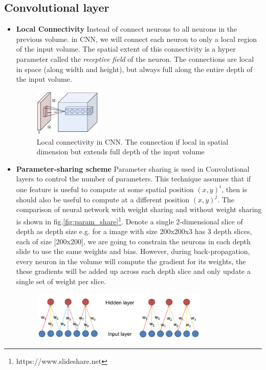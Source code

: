 \subsection{Convolutional layer}
\begin{itemize}
    \item \textbf{Local Connectivity} Instead of connect neurons to all neurons in the previous volume. in \acrshort{CNN}, we will connect each neuron to only a local region of the input volume. The spatial extent of this connectivity is a hyper parameter called the \textit{receptive field} of the neuron. The connections are local in space (along width and height), but always full along the entire depth of the input volume.
    \begin{figure}[h!]
        \centering
        \includegraphics[width=0.3\textwidth]{Chapters/Fig/local_connectivity.jpeg}
        \caption{Local connectivity in \acrshort{CNN}. The connection if local in spatial dimension but extends full depth of the input volume}
        \label{fig:local_connect}
    \end{figure}
    \item \textbf{Parameter-sharing scheme} Parameter sharing is used in Convolutional layers to control the number of parameters. 
    This technique assumes that if one feature is useful to compute at some spatial position $(x,y)^i$, then is should also be useful
     to compute at a different position $(x,y)^j$. The comparison of neural network with weight sharing and without weight sharing is 
     shown in fig.\ref{fig:param_share}\footnote{https://www.slideshare.net}.
      Denote a single 2-dimensional slice of depth as depth size e.g. 
     for a image with size 200x200x3 has 3 depth slices, each of size [200x200], 
     we are going to constrain the neurons in each depth slide to use the same weights and bias. However, during back-propagation, every neuron in the volume will compute the gradient for its weights, the these gradients will be added up across each depth slice and only update a single set of weight per slice.
    \begin{figure}[h!]
        \centering
        \includegraphics[width=0.8\textwidth]{Chapters/Fig/parameter-sharing.png}

\end{figure}
\end{itemize}
